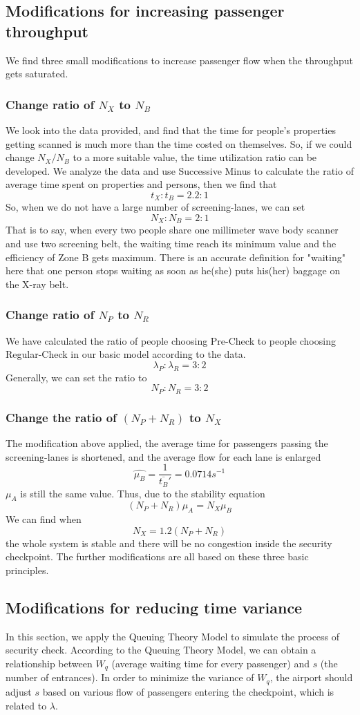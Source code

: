 \documentclass{mcmthesis}
\begin{document}
\subsection{Modifications for increasing passenger throughput}
We find three small modifications to increase passenger flow when the throughput gets saturated.
\subsubsection{Change ratio of $N_X$ to $N_B$}
We look into the data provided, and find that the time for people's properties getting scanned is much more than the time costed on themselves. So, if we could change $N_X/N_B$ to a more suitable value, the time utilization ratio can be developed. We analyze the data and use Successive Minus to calculate the ratio of average time spent on properties and persons, then we find that
$$t_X:t_B=2.2:1$$
So, when we do not have a large number of screening-lanes, we can set 
$$N_X:N_B=2:1$$
That is to say, when every two people share one millimeter wave body scanner and use two screening belt, the waiting time reach its minimum value and the efficiency of Zone B gets maximum. There is an accurate definition for "waiting" here that one person stops waiting as soon as he(she) puts his(her) baggage on the X-ray belt.
\subsubsection{Change ratio of $N_P$ to $N_R$}
We have calculated the ratio of people choosing Pre-Check to people choosing Regular-Check in our basic model according to the data.
$$\lambda_P:\lambda_R=3:2$$
Generally, we can set the ratio to
$$N_P:N_R=3:2$$
\subsubsection{Change the ratio of $(N_P+N_R)$ to $N_X$}
The modification above applied, the average time for passengers passing the screening-lanes is shortened, and the average flow for each lane is enlarged
$$\widehat{\mu_B}=\frac{1}{\overline{t_B}'}=0.0714s^{-1}$$
$\mu_A$ is still the same value. Thus, due to the stability equation
$$(N_P+N_R)\mu_A=N_X\mu_B$$
We can find when
$$N_X=1.2(N_P+N_R)$$
the whole system is stable and there will be no congestion inside the security checkpoint.
The further modifications are all based on these three basic principles.
\subsection{Modifications for reducing time variance}
In this section, we apply the Queuing Theory Model to simulate the process of security check. According to the Queuing Theory Model, we can obtain a relationship between $W_q$ (average waiting time for every passenger) and $s$ (the number of entrances). In order to minimize the variance of $W_q$, the airport should adjust $s$ based on various flow of passengers entering the checkpoint, which is related to $\lambda$.
\end{document}
